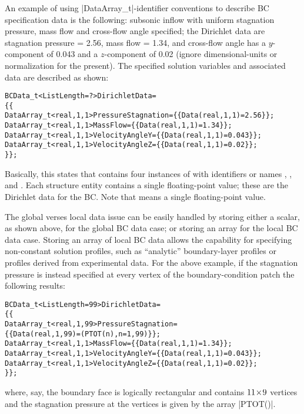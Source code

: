 An example of using |DataArray_t|-identifier conventions to describe
BC specification data is the following: subsonic inflow with uniform
stagnation pressure, mass flow and cross-flow angle specified; the
Dirichlet data are stagnation pressure = 2.56, mass flow = 1.34, and
cross-flow angle has a $y$-component of 0.043 and a $z$-component of
0.02 (ignore dimensional-units or normalization for the present).  The
specified solution variables and associated data are described as shown:
\begin{alltt}
  BCData\_t<ListLength=?> DirichletData = 
    \{\{
    DataArray\_t<real, 1, 1> PressureStagnation = \{\{ Data(real, 1, 1) = 2.56  \}\} ;
    DataArray\_t<real, 1, 1> MassFlow           = \{\{ Data(real, 1, 1) = 1.34  \}\} ;
    DataArray\_t<real, 1, 1> VelocityAngleY     = \{\{ Data(real, 1, 1) = 0.043 \}\} ;
    DataArray\_t<real, 1, 1> VelocityAngleZ     = \{\{ Data(real, 1, 1) = 0.02  \}\} ;
    \}\} ;
\end{alltt}
Basically, this states that  contains four
instances of  with identifiers or names
, ,  and
.
Each  structure entity contains a single
floating-point value; these are the Dirichlet data for the BC.
Note that  means a single floating-point value.

The global verses local data issue can be easily handled by storing
either a scalar, as shown above, for the global BC data case; or storing
an array for the local BC data case.  Storing an array of local BC data
allows the capability for specifying non-constant solution profiles,
such as ``analytic'' boundary-layer profiles or profiles derived from
experimental data.  For the above example, if the stagnation pressure is
instead specified at every vertex of the boundary-condition patch the
following results:
\begin{alltt}
  BCData\_t<ListLength=99> DirichletData = 
    \{\{
    DataArray\_t<real, 1, 99> PressureStagnation = 
      \{\{ Data(real, 1, 99) = (PTOT(n), n=1,99) \}\} ;
    DataArray\_t<real, 1, 1> MassFlow           = \{\{ Data(real, 1, 1) = 1.34  \}\} ;
    DataArray\_t<real, 1, 1> VelocityAngleY     = \{\{ Data(real, 1, 1) = 0.043 \}\} ;
    DataArray\_t<real, 1, 1> VelocityAngleZ     = \{\{ Data(real, 1, 1) = 0.02  \}\} ;
    \}\} ;
\end{alltt}
where, say, the boundary face is logically rectangular and contains
$11\!\times\! 9$ vertices and the stagnation pressure at the vertices is
given by the array |PTOT()|.

